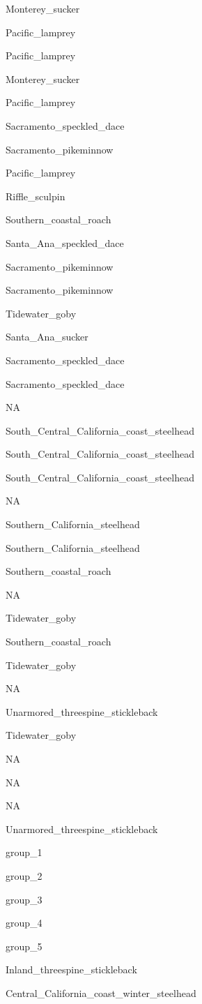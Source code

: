 \documentclass[]{article}
\begin{document}
Monterey\_sucker

Pacific\_lamprey

Pacific\_lamprey

Monterey\_sucker

Pacific\_lamprey

Sacramento\_speckled\_dace

Sacramento\_pikeminnow

Pacific\_lamprey

Riffle\_sculpin

Southern\_coastal\_roach

Santa\_Ana\_speckled\_dace

Sacramento\_pikeminnow

Sacramento\_pikeminnow

Tidewater\_goby

Santa\_Ana\_sucker

Sacramento\_speckled\_dace

Sacramento\_speckled\_dace

NA

South\_Central\_California\_coast\_steelhead

South\_Central\_California\_coast\_steelhead

South\_Central\_California\_coast\_steelhead

NA

Southern\_California\_steelhead

Southern\_California\_steelhead

Southern\_coastal\_roach

NA

Tidewater\_goby

Southern\_coastal\_roach

Tidewater\_goby

NA

Unarmored\_threespine\_stickleback

Tidewater\_goby

NA

NA

NA

Unarmored\_threespine\_stickleback

group\_1

group\_2

group\_3

group\_4

group\_5

Inland\_threespine\_stickleback

Central\_California\_coast\_winter\_steelhead
\end{document}
